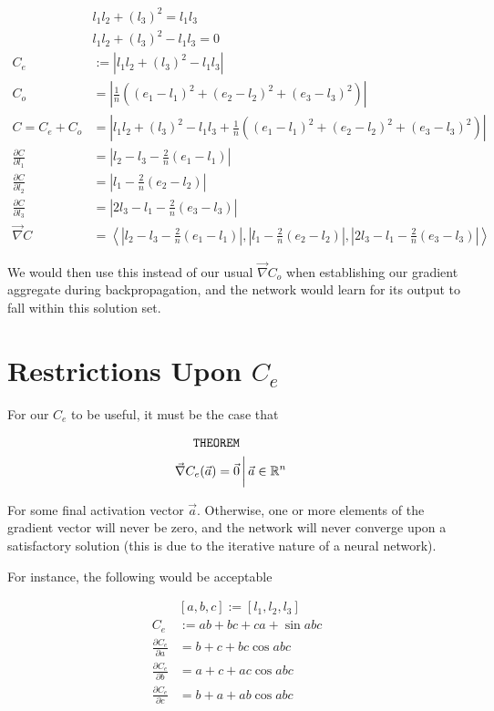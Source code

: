 \documentclass[8pt]{amsart}
\newcommand\where{\, \bigg \rvert \,}
\begin{document}
\[
\begin{aligned}
    &l_1 l_2 + (l_3)^2 = l_1 l_3 \\
    &l_1 l_2 + (l_3)^2 - l_1 l_3 = 0 \\
    C_e &:= \left| l_1 l_2 + (l_3)^2 - l_1 l_3 \right| \\
    C_o &= \left| \frac{1}{n} \left( (e_1 - l_1)^2 + (e_2 - l_2)^2 + (e_3 - l_3)^2 \right) \right| \\
    C = C_e + C_o &= \left| l_1 l_2 + (l_3)^2 - l_1 l_3 + \frac{1}{n} \left( (e_1 - l_1)^2 + (e_2 - l_2)^2 + (e_3 - l_3)^2 \right) \right| \\
    \frac{\partial C}{\partial l_1} &= \left| l_2 - l_3 - \frac{2}{n}(e_1 - l_1) \right| \\
    \frac{\partial C}{\partial l_2} &= \left| l_1 - \frac{2}{n}(e_2 - l_2) \right| \\
    \frac{\partial C}{\partial l_3} &= \left| 2 l_3 - l_1 - \frac{2}{n}(e_3 - l_3) \right| \\
    \vec{\nabla} C &= \left< \left| l_2 - l_3 - \frac{2}{n}(e_1 - l_1) \right|, 
        \left| l_1 - \frac{2}{n}(e_2 - l_2) \right|,
        \left| 2 l_3 - l_1 - \frac{2}{n}(e_3 - l_3) \right| \right>
\end{aligned}
\]

We would then use this instead of our usual $\vec{\nabla} C_o$ when establishing
our gradient aggregate during backpropagation, and the network would learn for its
output to fall within this solution set.

\section{Restrictions Upon $C_e$}

For our $C_e$ to be useful, it must be the case that

\[
\begin{aligned}
    \verb|THEOREM| \\
    \vec{\nabla} C_e (\vec{a}) = \vec{0} &\where \vec{a} \in \mathbb{R}^n
\end{aligned}
\]

For some final activation vector $\vec{a}$. Otherwise, one or more elements of 
the gradient vector will never be zero, and the network will never converge upon
a satisfactory solution (this is due to the iterative nature of a neural network).

For instance, the following would be acceptable

\[
\begin{aligned}
    &\left[ a, b, c \right] := \left[ l_1, l_2, l_3 \right] \\
    C_e &:= ab + bc + ca + \sin{abc} \\
    \frac{\partial C_e}{\partial a} &= b + c + bc \cos{abc} \\
    \frac{\partial C_e}{\partial b} &= a + c + ac \cos{abc} \\
    \frac{\partial C_e}{\partial c} &= b + a + ab \cos{abc} \\
\end{aligned}
\]
\end{document}
